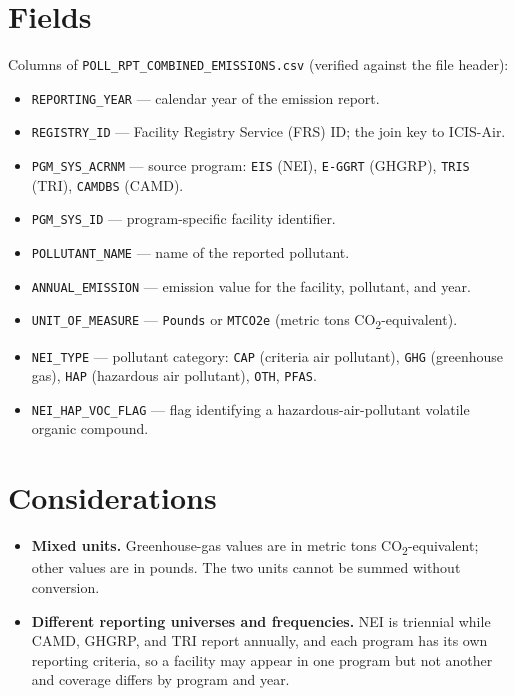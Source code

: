 \documentclass[11pt]{article}
\begin{document}
\section*{Fields}
Columns of \texttt{POLL\_RPT\_COMBINED\_EMISSIONS.csv} (verified against the file header):
\begin{itemize}
  \item \texttt{REPORTING\_YEAR} --- calendar year of the emission report.
  \item \texttt{REGISTRY\_ID} --- Facility Registry Service (FRS) ID; the join key to ICIS-Air.
  \item \texttt{PGM\_SYS\_ACRNM} --- source program: \texttt{EIS} (NEI), \texttt{E-GGRT} (GHGRP),
  \texttt{TRIS} (TRI), \texttt{CAMDBS} (CAMD).
  \item \texttt{PGM\_SYS\_ID} --- program-specific facility identifier.
  \item \texttt{POLLUTANT\_NAME} --- name of the reported pollutant.
  \item \texttt{ANNUAL\_EMISSION} --- emission value for the facility, pollutant, and year.
  \item \texttt{UNIT\_OF\_MEASURE} --- \texttt{Pounds} or \texttt{MTCO2e} (metric tons
  CO\textsubscript{2}-equivalent).
  \item \texttt{NEI\_TYPE} --- pollutant category: \texttt{CAP} (criteria air pollutant), \texttt{GHG}
  (greenhouse gas), \texttt{HAP} (hazardous air pollutant), \texttt{OTH}, \texttt{PFAS}.
  \item \texttt{NEI\_HAP\_VOC\_FLAG} --- flag identifying a hazardous-air-pollutant volatile organic
  compound.
\end{itemize}

\section*{Considerations}
\begin{itemize}
  \item \textbf{Mixed units.} Greenhouse-gas values are in metric tons CO\textsubscript{2}-equivalent;
  other values are in pounds. The two units cannot be summed without conversion.
  \item \textbf{Different reporting universes and frequencies.} NEI is triennial while CAMD, GHGRP, and
  TRI report annually, and each program has its own reporting criteria, so a facility may appear in one
  program but not another and coverage differs by program and year.
\end{itemize}
\end{document}
